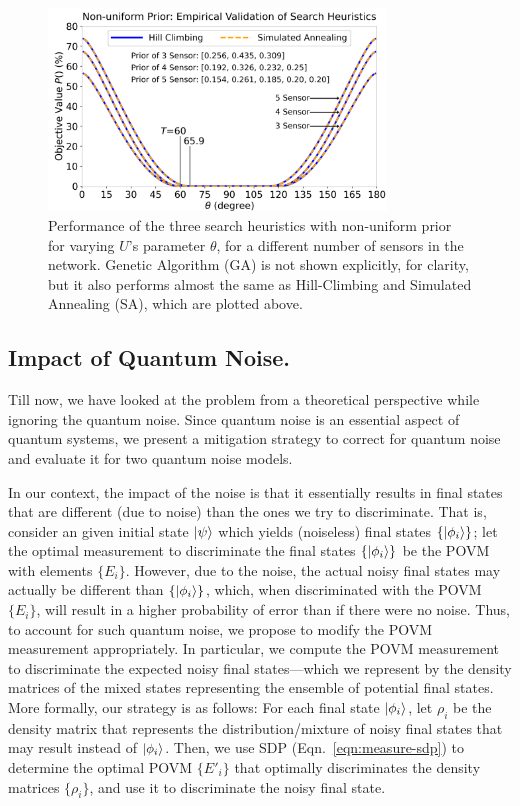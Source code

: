 \begin{figure}[ht]
    \centering
    \includegraphics[width=0.8\textwidth]{chapters/tqc/figures/varying_theta_nonequal_prior.png}
    \caption{Performance of the three search heuristics with non-uniform prior for varying $U$'s parameter $\theta$, 
             for a different number of sensors in the network. Genetic Algorithm (GA) is not shown explicitly, for clarity, 
             but it also performs almost the same as Hill-Climbing and Simulated Annealing (SA), which are plotted above.}
    \label{fig:non-uniform-heuristics}
\end{figure}

\subsection{Impact of Quantum Noise.}
\label{subsec:affect_noise}
Till now, we have looked at the \iso problem from a theoretical perspective while ignoring the quantum noise. 
Since quantum noise is an essential aspect of quantum systems, we present a mitigation strategy to correct for quantum noise and evaluate it for two quantum noise models.


In our context, the impact of the noise is that it essentially results in final states that are different (due to noise) than the ones we try to discriminate. 
That is, 
consider an given initial state $\ket{\psi}$ which yields (noiseless) final states $\{ \ket{\phi_i}\}$; let the optimal measurement to discriminate the final states $\{ \ket{\phi_i}\}$ be the POVM with elements $\{ E_i\}$.
However, due to the noise, the actual noisy final states may actually be different than $\{ \ket{\phi_i}\}$, which, when discriminated with the POVM $\{ E_i\}$, will result
in a higher probability of error than if there were no noise.
Thus, to account for such quantum noise, we propose to modify the POVM measurement appropriately. In particular, we compute the POVM measurement to discriminate 
the expected noisy final states---which we represent by the density matrices of the 
mixed states representing the ensemble of potential final states. 
More formally, our strategy is as follows: For each final state $\ket{\phi_i}$, let $\rho_i$ be the density matrix that represents the distribution/mixture of noisy final states that may
result instead of $\ket{\phi_i}$. 
Then, we use SDP (Eqn.~\ref{eqn:measure-sdp}) to determine the optimal POVM $\{ E'_i\}$ that optimally discriminates the density matrices $\{\rho_i\}$, 
and use it to discriminate the noisy final state.


